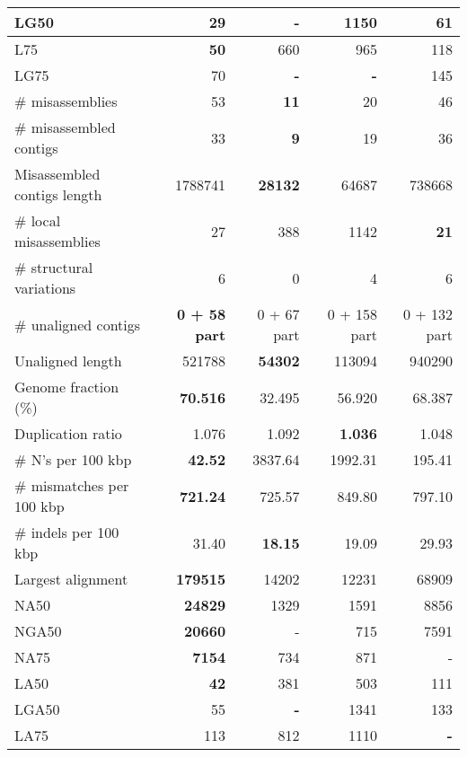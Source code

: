\documentclass[12pt,a4paper]{article}
\begin{document}
\begin{table}[ht]
\begin{center}
\begin{tabular}{|l*{4}{|r}|}
LG50 & 29 & {\bf -} & 1150 & 61 \\ \hline
L75 & {\bf 50} & 660 & 965 & 118 \\ \hline
LG75 & 70 & {\bf -} & {\bf -} & 145 \\ \hline
\# misassemblies & 53 & {\bf 11} & 20 & 46 \\ \hline
\# misassembled contigs & 33 & {\bf 9} & 19 & 36 \\ \hline
Misassembled contigs length & 1788741 & {\bf 28132} & 64687 & 738668 \\ \hline
\# local misassemblies & 27 & 388 & 1142 & {\bf 21} \\ \hline
\# structural variations & 6 & 0 & 4 & 6 \\ \hline
\# unaligned contigs & {\bf 0 + 58 part} & 0 + 67 part & 0 + 158 part & 0 + 132 part \\ \hline
Unaligned length & 521788 & {\bf 54302} & 113094 & 940290 \\ \hline
Genome fraction (\%) & {\bf 70.516} & 32.495 & 56.920 & 68.387 \\ \hline
Duplication ratio & 1.076 & 1.092 & {\bf 1.036} & 1.048 \\ \hline
\# N's per 100 kbp & {\bf 42.52} & 3837.64 & 1992.31 & 195.41 \\ \hline
\# mismatches per 100 kbp & {\bf 721.24} & 725.57 & 849.80 & 797.10 \\ \hline
\# indels per 100 kbp & 31.40 & {\bf 18.15} & 19.09 & 29.93 \\ \hline
Largest alignment & {\bf 179515} & 14202 & 12231 & 68909 \\ \hline
NA50 & {\bf 24829} & 1329 & 1591 & 8856 \\ \hline
NGA50 & {\bf 20660} & - & 715 & 7591 \\ \hline
NA75 & {\bf 7154} & 734 & 871 & - \\ \hline
LA50 & {\bf 42} & 381 & 503 & 111 \\ \hline
LGA50 & 55 & {\bf -} & 1341 & 133 \\ \hline
LA75 & 113 & 812 & 1110 & {\bf -} \\ \hline
\end{tabular}
\end{center}
\end{table}
\end{document}
